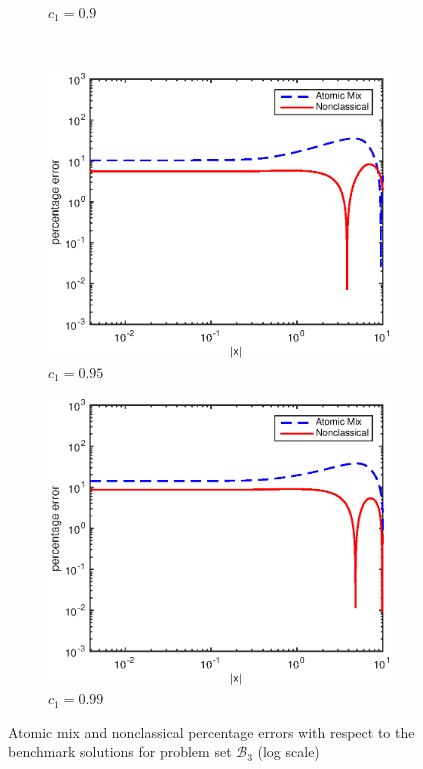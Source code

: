 \documentclass[12pt]{article}
\newcommand{\setb}{\mathcal{B}}
\begin{document}
{\begin{figure}[p]
\begin{subfigure}{0.495\textwidth}
        \caption{$c_1 = 0.9$}
        \label{figerrF90}
    \end{subfigure}
    \\
    \centering
    \begin{subfigure}{0.495\textwidth}
        \centering
        \includegraphics[width=\textwidth]{NSE_err_F95.eps}
        \caption{$c_1 = 0.95$}
        \label{figerrF95}
    \end{subfigure}
    \hfill
    \begin{subfigure}{0.495\textwidth}
        \centering
        \includegraphics[width=\textwidth]{NSE_err_F99.eps}
        \caption{$c_1 = 0.99$}
        \label{figerrF99}
    \end{subfigure}
    \caption{Atomic mix and nonclassical percentage errors with respect to the benchmark solutions for problem set $\setb_3$ (log scale)}
    \label{figerrF2}
\end{figure}





}
\end{document}
